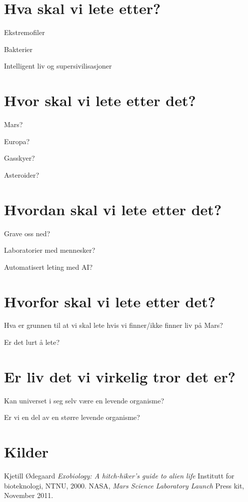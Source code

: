 \documentclass[5p]{elsarticle}
\renewenvironment{abstract}{\global\setbox\absbox=\vbox\bgroup
\hsize=\textwidth\def\baselinestretch{1}%
\noindent\unskip\textbf{Introduksjon}
\par\medskip\noindent\unskip\ignorespaces}
{\egroup}
\begin{document}

\section*{Hva skal vi lete etter?}
Ekstremofiler

Bakterier

Intelligent liv og supersivilisasjoner

\section*{Hvor skal vi lete etter det?}
Mars?

Europa?

Gasskyer?

Asteroider?

\section*{Hvordan skal vi lete etter det?}
Grave oss ned?

Laboratorier med mennesker?

Automatisert leting med AI?

\section*{Hvorfor skal vi lete etter det?}
Hva er grunnen til at vi skal lete hvis vi finner/ikke finner liv på Mars?

Er det lurt å lete?

\section*{Er liv det vi virkelig tror det er?}
Kan universet i seg selv være en levende organisme?

Er vi en del av en større levende organisme?


\section*{Kilder}

\begin{thebibliography}{99}	%
		Kjetill Ødegaard
		\emph{Exobiology: A hitch-hiker's guide to alien life}
		Institutt for bioteknologi,
		NTNU,
		2000.
		NASA,
		\emph{Mars Science Laboratory Launch}
		Press kit,
		November 2011.
\end{thebibliography}
\end{document}
